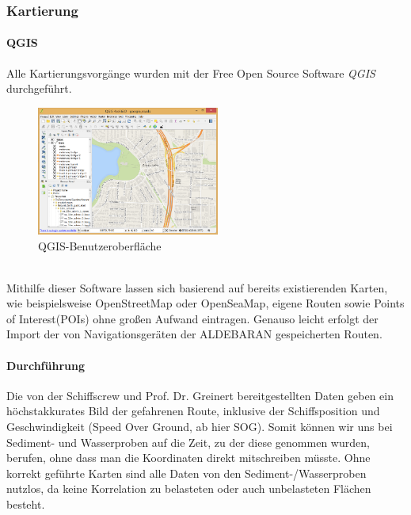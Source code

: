 \subsubsection{Kartierung}
\paragraph{QGIS}
Alle Kartierungsvorgänge wurden mit der Free Open Source Software \emph{QGIS}\cite{qgis} durchgeführt.
\begin{figure}[ht]
    \centering
    \includegraphics[width=6cm]{Images/QGIS/about-screenshot.png}
    \caption[fig:qgisabout]{QGIS-Benutzeroberfläche}
\end{figure}
\\Mithilfe dieser Software lassen sich basierend auf bereits existierenden Karten, 
wie beispielsweise OpenStreetMap\cite{ostrm} oder OpenSeaMap\cite{oseam}, eigene Routen sowie
Points of Interest(POIs) ohne großen Aufwand eintragen. Genauso leicht erfolgt der Import der von 
Navigationsgeräten der ALDEBARAN gespeicherten Routen.
\paragraph{Durchführung}
Die von der Schiffscrew und Prof. Dr. Greinert bereitgestellten Daten geben ein höchstakkurates Bild der
gefahrenen Route, inklusive der Schiffsposition und Geschwindigkeit (Speed Over Ground, ab hier SOG).
Somit können wir uns bei Sediment- und Wasserproben auf die Zeit, zu der diese genommen wurden, berufen,
ohne dass man die Koordinaten direkt mitschreiben müsste.
Ohne korrekt geführte Karten sind alle Daten von den Sediment-/Wasserproben nutzlos, da keine Korrelation
zu belasteten oder auch unbelasteten Flächen besteht.
